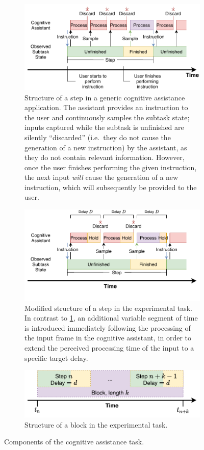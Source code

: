 \documentclass[10pt,letterpaper]{article}
\begin{document}
\begin{figure}[hp]
  \centering
  \begin{subfigure}{\textwidth}
    \centering
    \includegraphics[width=.8\textwidth]{images/step_structure.pdf}
    \caption{Structure of a step in a generic cognitive assistance application. 
    The assistant provides an instruction to the user and continuously samples the subtask state; inputs captured while the subtask is unfinished are silently ``discarded'' (i.e.\ they do not cause the generation of a new instruction) by the assistant, as they do not contain relevant information.
    However, once the user finishes performing the given instruction, the next input \emph{will} cause the generation of a new instruction, which will subsequently be provided to the user.}%
    \label{fig:cogassist:step}
  \end{subfigure}
  \medskip%
  \begin{subfigure}{\textwidth}
    \centering
    \includegraphics[width=.8\textwidth]{images/step_structure_delay.pdf}
    \caption{Modified structure of a step in the experimental task. In contrast to \cref{fig:cogassist:step}, an additional variable segment of time is introduced immediately following the processing of the input frame in the cognitive assistant, in order to extend the perceived processing time of the input to a specific target delay.}%
    \label{fig:cogassist:step:delay}
  \end{subfigure}
  \medskip%
  \begin{subfigure}{\textwidth}
    \centering
    \includegraphics[width=.8\textwidth]{images/block.pdf}
    \caption{Structure of a block in the experimental task.}%
    \label{fig:cogassist:block}
  \end{subfigure}%
  \caption{Components of the cognitive assistance task.}
\end{figure}
\end{document}
